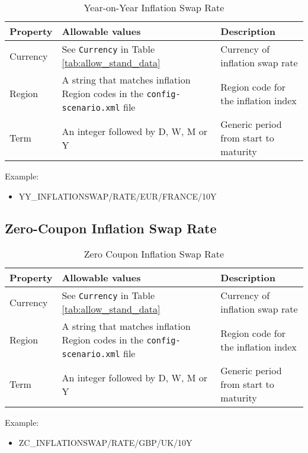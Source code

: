 \begin{table}[H]
\centering
\begin{supertabular}{|p{3cm}|p{5cm}|p{7cm}|}
\hline
{\bf Property} & {\bf Allowable values} & {\bf Description} \\
\hline
Currency & See \lstinline!Currency! in Table \ref{tab:allow_stand_data} & Currency of inflation swap rate\\ \hline
Region & A string that matches inflation Region codes in the {\tt config-scenario.xml} file & Region code for the inflation index \\ \hline
Term & An integer followed by D, W, M or Y & Generic period from start to maturity\\
\hline
\end{supertabular}
  \caption{Year-on-Year Inflation Swap Rate}
  \label{tab:yoyinflation_quote}
\end{table}

Example:
\begin{itemize}
\item {YY\_INFLATIONSWAP/RATE/EUR/FRANCE/10Y}
\end{itemize}

\subsection{Zero-Coupon Inflation Swap Rate}


\begin{table}[H]
\centering
\begin{tabular}{|p{3cm}|p{5cm}|p{7cm}|}
\hline
{\bf Property} & {\bf Allowable values} & {\bf Description} \\
\hline
Currency & See \lstinline!Currency! in Table \ref{tab:allow_stand_data} & Currency of inflation swap rate\\ \hline
Region & A string that matches inflation Region codes in the {\tt config-scenario.xml} file & Region code for the inflation index \\ \hline
Term & An integer followed by D, W, M or Y & Generic period from start to maturity\\
\hline
\end{tabular}
  \caption{Zero Coupon Inflation Swap Rate}
  \label{tab:zinflation_quote}
\end{table}

Example: 
\begin{itemize}
\item {ZC\_INFLATIONSWAP/RATE/GBP/UK/10Y}
\end{itemize}

